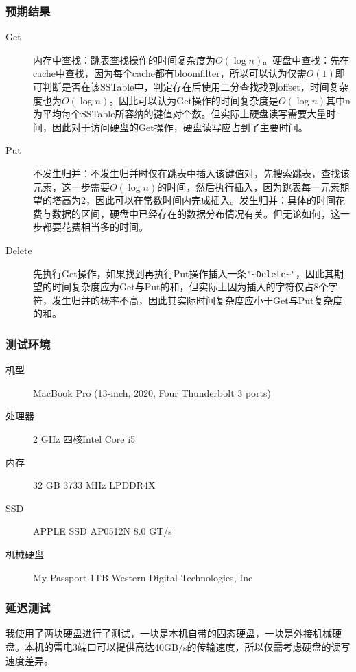 \documentclass[fontset=windows]{article}
\begin{document}
\subsubsection{预期结果}
\begin{description}
\item[Get] 内存中查找：跳表查找操作的时间复杂度为$O(\log n)$。硬盘中查找：先在cache中查找，因为每个cache都有bloomfilter，所以可以认为仅需$O(1)$即可判断是否在该SSTable中，判定存在后使用二分查找找到offset，时间复杂度也为$O(\log n)$。因此可以认为Get操作的时间复杂度是$O(\log n)$其中n为平均每个SSTable所容纳的键值对个数。但实际上硬盘读写需要大量时间，因此对于访问硬盘的Get操作，硬盘读写应占到了主要时间。
\item[Put] 不发生归并：不发生归并时仅在跳表中插入该键值对，先搜索跳表，查找该元素，这一步需要$O(\log n)$的时间，然后执行插入，因为跳表每一元素期望的塔高为2，因此可以在常数时间内完成插入。发生归并：具体的时间花费与数据的区间，硬盘中已经存在的数据分布情况有关。但无论如何，这一步都要花费相当多的时间。
\item[Delete] 先执行Get操作，如果找到再执行Put操作插入一条\verb|"~Delete~"|，因此其期望的时间复杂度应为Get与Put的和，但实际上因为插入的字符仅占8个字符，发生归并的概率不高，因此其实际时间复杂度应小于Get与Put复杂度的和。
\end{description}
\subsubsection{测试环境}
\begin{description}
\item[机型] MacBook Pro (13-inch, 2020, Four Thunderbolt 3 ports)
\item[处理器] 2 GHz 四核Intel Core i5
\item[内存] 32 GB 3733 MHz LPDDR4X
\item[SSD] APPLE SSD AP0512N 8.0 GT/s
\item[机械硬盘] My Passport 1TB Western Digital Technologies, Inc
\end{description}
\subsubsection{延迟测试}
我使用了两块硬盘进行了测试，一块是本机自带的固态硬盘，一块是外接机械硬盘。本机的雷电3端口可以提供高达40GB/s的传输速度，所以仅需考虑硬盘的读写速度差异。
\end{document}
